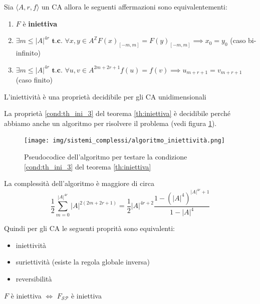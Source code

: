 \begin{teorema}
    \label{th:iniettiva}
    Sia $\langle A,r,f\rangle$ un CA allora le seguenti affermazioni sono equivalentementi:
    \begin{enumerate}
        \item $F$ è \textbf{iniettiva}
        \item $\exists m \le |A|^{4r} \textbf{ t.c. } \forall x, y \in A^\mathbb{Z} F(x)_{[-m,m]}=F(y)_{[-m,m]} \implies x_0=y_0$
              (caso bi-infinito)
        \item \label{cond:th_ini_3}$\exists m \le |A|^{4r} \textbf{ t.c. } \forall u,v \in A^{2m+2r+1} f(u)= f(v) \implies u_{m+r+1} = v_{m+r+1}$
              (caso finito)
    \end{enumerate}
\end{teorema}
\begin{teorema}
    L'iniettività è una proprietà decidibile per gli CA unidimensionali

\end{teorema}
La proprietà \ref{cond:th_ini_3} del teorema \ref{th:iniettiva} è decidibile perché
abbiamo anche un algoritmo per risolvere il problema (vedi figura \ref{fig:algo_iniettiva}).
\begin{figure}[!h]
    \centering
    \texttt{[image: img/sistemi\_complessi/algoritmo\_iniettività.png]}
    \caption{Pseudocodice dell'algoritmo per testare la condizione \ref{cond:th_ini_3} del teorema \ref{th:iniettiva}}
    \label{fig:algo_iniettiva}
\end{figure}
\begin{nota}
    La complessità dell'algoritmo è maggiore di circa
    \begin{equation*}
        \frac{1}{2} \sum_{m=0}^{|A|^{4r}} |A|^{2(2m+2r+1)} = \frac{1}{2}  |A|^{4r+2}
        \frac{1-(|A|^4)^{|A|^{4r}+1}}{1-|A|^4}
    \end{equation*}
\end{nota}

Quindi per gli CA le seguenti proprità sono equivalenti:
\begin{itemize}
    \item iniettività
    \item suriettività (esiste la regola globale inversa)
    \item reversibilità
\end{itemize}

\begin{teorema}
    $F$ è iniettiva $\iff$ $F_{\mathcal{SP}}$ è iniettiva
\end{teorema}

